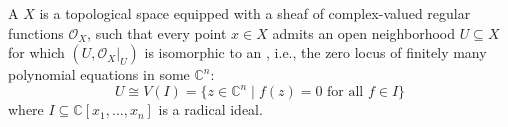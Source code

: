 \begin{definition} \label{definition:complex_algebraic_variety}
A  \(X\) is a topological space equipped with a sheaf of complex-valued regular functions \(\mathcal{O}_X\), such that every point \(x \in X\) admits an open neighborhood \(U \subseteq X\) for which \((U, \mathcal{O}_X|_U)\) is isomorphic to an , i.e., the zero locus of finitely many polynomial equations in some \(\mathbb{C}^n\):
\[
U \cong V(I) = \{ z \in \mathbb{C}^n \mid f(z) = 0 \text{ for all } f \in I \}
\]
where \(I \subseteq \mathbb{C}[x_1, \dots, x_n]\) is a radical ideal.
\end{definition}